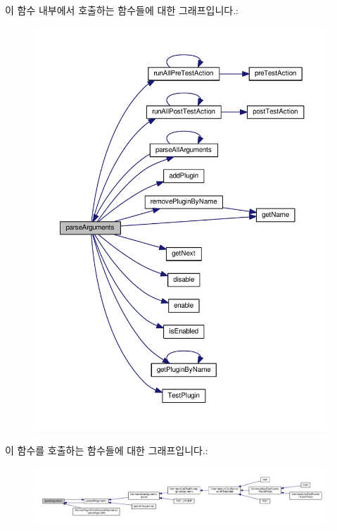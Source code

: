 이 함수 내부에서 호출하는 함수들에 대한 그래프입니다.\+:
\nopagebreak
\begin{figure}[H]
\begin{center}
\leavevmode
\includegraphics[width=350pt]{class_test_plugin_a167c2b07a0f83726bb9b1d1c0d741f88_cgraph}
\end{center}
\end{figure}




이 함수를 호출하는 함수들에 대한 그래프입니다.\+:
\nopagebreak
\begin{figure}[H]
\begin{center}
\leavevmode
\includegraphics[width=350pt]{class_test_plugin_a167c2b07a0f83726bb9b1d1c0d741f88_icgraph}
\end{center}
\end{figure}


